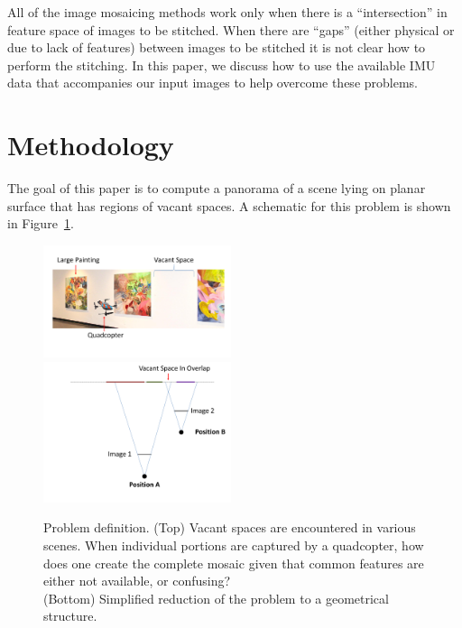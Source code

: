 \documentclass[10pt,twocolumn,letterpaper]{article}
\begin{document}
All of the image mosaicing methods work only when there is a
``intersection'' in feature space of images to be stitched. When there
are ``gaps'' (either physical or due to lack of features) between
images to be stitched it is not clear how to perform the stitching. In
this paper, we discuss how to use the available IMU data that
accompanies our input images to help overcome these problems.


\section{Methodology}

The goal of this paper is to compute a panorama of a scene lying on
planar surface that has regions of vacant spaces.  A schematic for
this problem is shown in Figure~\ref{fig:schematic}.

\begin{figure}[h!]
  \centering
  \includegraphics[width=0.49\textwidth]{figures/indoor}\\
  \includegraphics[width=0.49\textwidth]{figures/stereoOverlap}\\

  \caption{ \label{fig:schematic} Problem definition. (Top) Vacant spaces
    are encountered in various scenes.  When individual portions are
    captured by a quadcopter, how does one create the complete mosaic
    given that common features are either not available, or
    confusing?\\
    (Bottom) Simplified reduction of the problem to a geometrical structure.
  }
\end{figure}    
\end{document}
